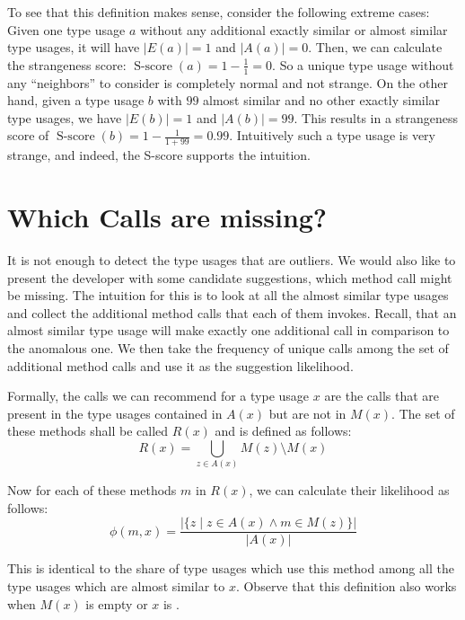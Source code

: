 To see that this definition makes sense, consider the following extreme cases:
Given one type usage $a$ without any additional exactly similar or almost similar type usages, it will have $|E(a)| = 1$ and $|A(a)| = 0$.
Then, we can calculate the strangeness score: $\operatorname{S-score}(a) = 1-\frac{1}{1} = 0$.
So a unique type usage without any ``neighbors'' to consider is completely normal and not strange.
On the other hand, given a type usage $b$ with $99$ almost similar and no other exactly similar type usages, we have $|E(b)| = 1$ and $|A(b)| = 99$.
This results in a strangeness score of $\operatorname{S-score}(b) = 1-\frac{1}{1+99} = 0.99$.
Intuitively such a type usage is very strange, and indeed, the S-score supports the intuition.

\section{Which Calls are missing?}

It is not enough to detect the type usages that are outliers.
We would also like to present the developer with some candidate suggestions, which method call might be missing.
The intuition for this is to look at all the almost similar type usages and collect the additional method calls that each of them invokes.
Recall, that an almost similar type usage will make exactly one additional call in comparison to the anomalous one.
We then take the frequency of unique calls among the set of additional method calls and use it as the suggestion likelihood.

Formally, the calls we can recommend for a type usage $x$ are the calls that are present in the type usages contained in $A(x)$ but are not in $M(x)$.
The set of these methods shall be called $R(x)$ and is defined as follows:
\begin{equation*}
    R(x) = \bigcup_{z \in A(x)} M(z) \setminus M(x)
\end{equation*}

Now for each of these methods $m$ in $R(x)$, we can calculate their likelihood as follows:
\begin{equation*}
    \phi(m, x) = \frac{|\{z \mid z \in A(x) \land m \in M(z)\}|}{|A(x)|}
\end{equation*}

This is identical to the share of type usages which use this method among all the type usages which are almost similar to $x$.
Observe that this definition also works when $M(x)$ is empty or $x$ is .

